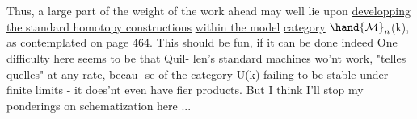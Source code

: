 \qquad Thus,  a large part of the weight of the work ahead may well lie
upon \uline{developping the standard homotopy constructions} \uline{within the model}
\uline{category} $\hand{\mathcal{M}}_n$(k),  as contemplated on page 464.  This should be fun,  if
it can be done indeed  One difficulty here seems to be that  Quil-%
len's  standard machines  wo'nt work, "telles quelles" at any rate,  becau-%
se of the category U(k) failing to be stable under finite limits - it
does'nt even have fier products.  But I think I'll stop my ponderings
on schematization here ...


